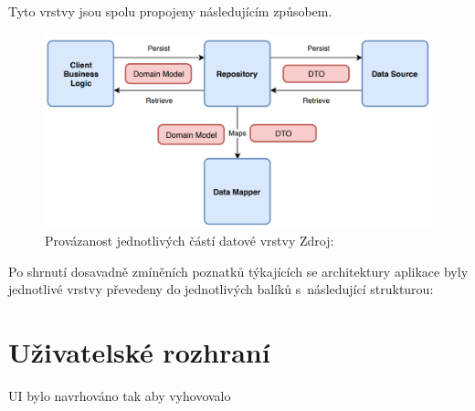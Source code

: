 \bigskip

Tyto vrstvy jsou spolu propojeny následujícím způsobem.

\begin{figure}[H]
  \centering
  \includegraphics[width=.8\textwidth]{arch_diagram.png}
  \caption{Provázanost jednotlivých částí datové vrstvy Zdroj: \cite{imgDataDiagram}}
  \label{fig:arch_diagram}
\end{figure}

\bigskip

Po shrnutí dosavadně zmíněních poznatků týkajících se architektury aplikace byly jednotlivé vrstvy převedeny do jednotlivých balíků s~následující
strukturou:

\bigskip






\section{Uživatelské rozhraní}
UI bylo navrhováno tak aby vyhovovalo 

